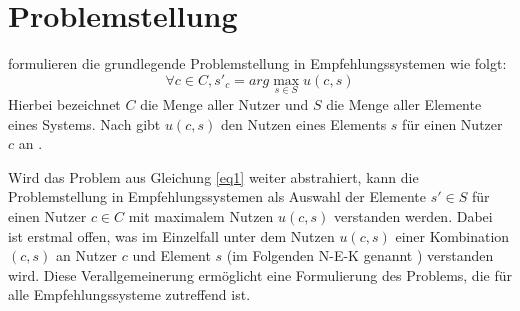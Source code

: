 \section{Problemstellung}
\label{ch:empfehlungssysteme:problemstellung}
\textcite[S. 735]{adomavicius:inproceedings} formulieren die grundlegende Problemstellung in Empfehlungssystemen wie folgt:
\begin{equation}\label{eq1}
    \forall c \in C, s'_c = arg\max_{s \in S} u(c,s)
\end{equation}
Hierbei bezeichnet $C$ die Menge aller Nutzer und $S$ die Menge aller Elemente eines Systems.
Nach \textcite[S. 735]{adomavicius:inproceedings} gibt $u(c,s)$ den Nutzen eines Elements $s$ für einen Nutzer $c$ an \cite[S. 734f.]{adomavicius:inproceedings}.

Wird das Problem aus Gleichung \ref{eq1} weiter abstrahiert, kann die Problemstellung in Empfehlungssystemen als Auswahl der Elemente $s' \in S$ für einen Nutzer $c \in C$ mit maximalem Nutzen $u(c,s)$ verstanden werden.
Dabei ist erstmal offen, was im Einzelfall unter dem Nutzen $u(c,s)$ einer Kombination $(c,s)$ an Nutzer $c$ und Element $s$ (im Folgenden \ac{N-E-K} genannt \cite[S. 3]{recommenderSystems:2016}) verstanden wird.
Diese Verallgemeinerung ermöglicht eine Formulierung des Problems, die für alle Empfehlungssysteme zutreffend ist.

